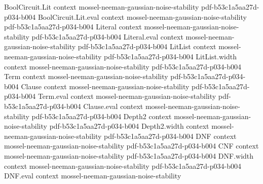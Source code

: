 \begin{theorem}
\label{BooleanAnalysis.GaussianSpace.majority_is_stablest_general_volume_maxInfluence}
\leanok
{}
\proofstep
  {BoolCircuit.Lit}
  {context}
  {mossel-neeman-gaussian-noise-stability}
  {pdf-b53c1a5aa27d-p034-b004}
\proofstep
  {BoolCircuit.Lit.eval}
  {context}
  {mossel-neeman-gaussian-noise-stability}
  {pdf-b53c1a5aa27d-p034-b004}
\proofstep
  {Literal}
  {context}
  {mossel-neeman-gaussian-noise-stability}
  {pdf-b53c1a5aa27d-p034-b004}
\proofstep
  {Literal.eval}
  {context}
  {mossel-neeman-gaussian-noise-stability}
  {pdf-b53c1a5aa27d-p034-b004}
\proofstep
  {LitList}
  {context}
  {mossel-neeman-gaussian-noise-stability}
  {pdf-b53c1a5aa27d-p034-b004}
\proofstep
  {LitList.width}
  {context}
  {mossel-neeman-gaussian-noise-stability}
  {pdf-b53c1a5aa27d-p034-b004}
\proofstep
  {Term}
  {context}
  {mossel-neeman-gaussian-noise-stability}
  {pdf-b53c1a5aa27d-p034-b004}
\proofstep
  {Clause}
  {context}
  {mossel-neeman-gaussian-noise-stability}
  {pdf-b53c1a5aa27d-p034-b004}
\proofstep
  {Term.eval}
  {context}
  {mossel-neeman-gaussian-noise-stability}
  {pdf-b53c1a5aa27d-p034-b004}
\proofstep
  {Clause.eval}
  {context}
  {mossel-neeman-gaussian-noise-stability}
  {pdf-b53c1a5aa27d-p034-b004}
\proofstep
  {Depth2}
  {context}
  {mossel-neeman-gaussian-noise-stability}
  {pdf-b53c1a5aa27d-p034-b004}
\proofstep
  {Depth2.width}
  {context}
  {mossel-neeman-gaussian-noise-stability}
  {pdf-b53c1a5aa27d-p034-b004}
\proofstep
  {DNF}
  {context}
  {mossel-neeman-gaussian-noise-stability}
  {pdf-b53c1a5aa27d-p034-b004}
\proofstep
  {CNF}
  {context}
  {mossel-neeman-gaussian-noise-stability}
  {pdf-b53c1a5aa27d-p034-b004}
\proofstep
  {DNF.width}
  {context}
  {mossel-neeman-gaussian-noise-stability}
  {pdf-b53c1a5aa27d-p034-b004}
\proofstep
  {DNF.eval}
  {context}
  {mossel-neeman-gaussian-noise-stability}

\end{theorem}
